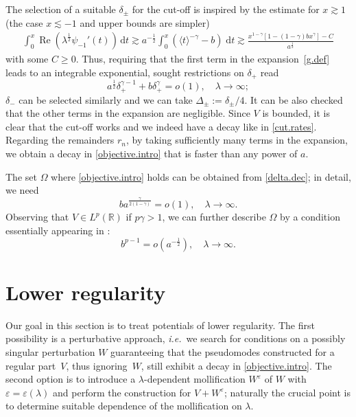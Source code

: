The selection of a suitable $\delta_\pm$ for the cut-off 
is inspired by the estimate for $x {\gtrsim} 1$
(the case $x {\lesssim} - 1$ and upper bounds are simpler)
\begin{equation}\label{Re.psi-1.dec}
\begin{aligned}
\int_0^x {\operatorname{Re}} (\lambda^\frac 12 \psi_{-1}'(t)) \, {\mathrm{d}} t
{\gtrsim}
a^{-\frac12}
\int_0^x
(\langle t \rangle^{-\gamma} - b ) \; {\mathrm{d}} t
{\gtrsim}
\frac{x^{1-\gamma}[1-(1-\gamma)bx^\gamma]
-C}{a^\frac12}
\end{aligned}
\end{equation}
with some $C \geq 0$. 
Thus, requiring that the first term in the expansion~\eqref{g.def}
leads to an integrable exponential, sought restrictions on $\delta_+$ read 
\begin{equation}\label{delta.dec}
a^\frac12 \delta_+^{\gamma-1} + b\delta_+^\gamma = o(1), \quad \lambda \to \infty;
\end{equation}
$\delta_-$ can be selected similarly 
and we can take $\Delta_\pm := \delta_\pm/4$. 
It can be also checked that the other terms in the expansion are negligible. Since $V$ is bounded, it is clear that the cut-off works and we indeed have a decay like in \eqref{cut.rates}. Regarding the remainders $r_n$, by taking sufficiently many terms in the expansion, we obtain a decay in \eqref{objective.intro} that is faster than any power of $a$. 

The set $\Omega$ where \eqref{objective.intro} holds can be obtained from \eqref{delta.dec}; in detail, we need 
\begin{equation}
b a^\frac{\gamma}{2(1-\gamma)} = o(1), \quad \lambda \to \infty.
\end{equation}
Observing that $V \in L^p({\mathbb{R}})$ if $p\gamma >1$, we can further describe $\Omega$ by a condition essentially appearing in \cite[Thm.~5]{Laptev-Safronov_2009}:
\begin{equation}\label{Omega.dec}
b^{p-1} = o(a^{-\frac 12}), \quad \lambda \to \infty.
\end{equation}

\section{Lower regularity}
\label{sec:low.reg}

Our goal in this section is to treat potentials of lower regularity. The first possibility is a perturbative approach, {\emph{i.e.}}~we
search for conditions on a possibly singular perturbation $W$ guaranteeing that the pseudomodes constructed for a regular part~$V$, 
thus  ignoring~$W$, still exhibit a decay in \eqref{objective.intro}. The second option is to introduce a $\lambda$-dependent mollification $W^{\varepsilon}$ of $W$ with ${\varepsilon}={\varepsilon}(\lambda)$ and perform the construction for $V + W^{\varepsilon}$; naturally the crucial point is to determine suitable dependence of the mollification on $\lambda$.

